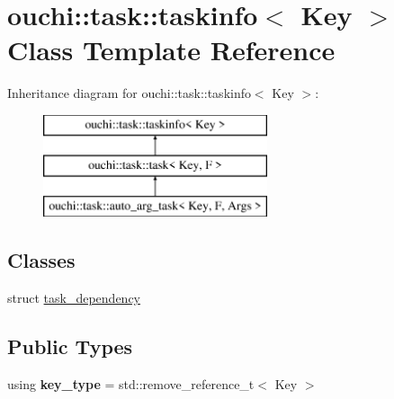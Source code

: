 \hypertarget{classouchi_1_1task_1_1taskinfo}{}\section{ouchi\+::task\+::taskinfo$<$ Key $>$ Class Template Reference}
\label{classouchi_1_1task_1_1taskinfo}
Inheritance diagram for ouchi\+::task\+::taskinfo$<$ Key $>$\+:\begin{figure}[H]
\begin{center}
\leavevmode
\includegraphics[height=3.000000cm]{classouchi_1_1task_1_1taskinfo}
\end{center}
\end{figure}
\subsection*{Classes}
\begin{DoxyCompactItemize}
\item 
struct \mbox{\hyperlink{structouchi_1_1task_1_1taskinfo_1_1task__dependency}{task\+\_\+dependency}}
\end{DoxyCompactItemize}
\subsection*{Public Types}
\begin{DoxyCompactItemize}
\item 
\mbox{\label{classouchi_1_1task_1_1taskinfo_afa46feb3c426a763994123c1c8061989}} 
using {\bfseries key\+\_\+type} = std\+::remove\+\_\+reference\+\_\+t$<$ Key $>$
\end{DoxyCompactItemize}
